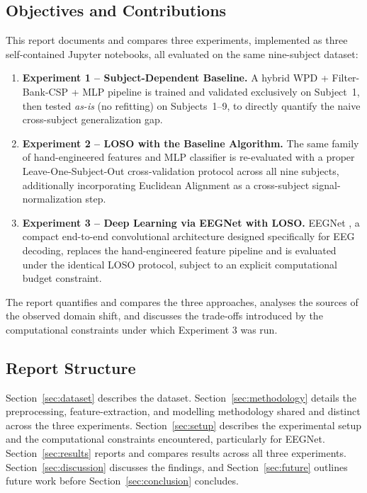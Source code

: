 \documentclass[11pt,a4paper]{article}
\begin{document}
\subsection{Objectives and Contributions}
This report documents and compares three experiments, implemented as three self-contained Jupyter
notebooks, all evaluated on the same nine-subject dataset:
\begin{enumerate}[leftmargin=1.2cm]
    \item \textbf{Experiment 1 -- Subject-Dependent Baseline.} A hybrid WPD + Filter-Bank-CSP +
    MLP pipeline is trained and validated exclusively on Subject~1, then tested \emph{as-is} (no
    refitting) on Subjects~1--9, to directly quantify the naive cross-subject generalization gap.
    \item \textbf{Experiment 2 -- LOSO with the Baseline Algorithm.} The same family of hand-engineered
    features and MLP classifier is re-evaluated with a proper Leave-One-Subject-Out cross-validation
    protocol across all nine subjects, additionally incorporating Euclidean Alignment as a
    cross-subject signal-normalization step.
    \item \textbf{Experiment 3 -- Deep Learning via EEGNet with LOSO.} EEGNet
    \cite{lawhern2018eegnet}, a compact end-to-end convolutional architecture designed specifically
    for EEG decoding, replaces the hand-engineered feature pipeline and is evaluated under the
    identical LOSO protocol, subject to an explicit computational budget constraint.
\end{enumerate}
The report quantifies and compares the three approaches, analyses the sources of the observed
domain shift, and discusses the trade-offs introduced by the computational constraints under which
Experiment 3 was run.

\subsection{Report Structure}
Section~\ref{sec:dataset} describes the dataset. Section~\ref{sec:methodology} details the
preprocessing, feature-extraction, and modelling methodology shared and distinct across the three
experiments. Section~\ref{sec:setup} describes the experimental setup and the computational
constraints encountered, particularly for EEGNet. Section~\ref{sec:results} reports and compares
results across all three experiments. Section~\ref{sec:discussion} discusses the findings, and
Section~\ref{sec:future} outlines future work before Section~\ref{sec:conclusion} concludes.
\end{document}
